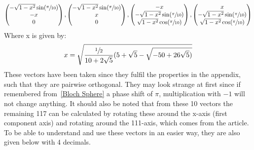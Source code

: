 \documentclass[
  utf8,%
  parskip,%
  largesmallcaps,intlimits,widermath,%
  sharecounter,nobreak,definition=marks,%
  noparts%
]{rtthesis}
\begin{document}
\begin{equation*}
\begin{pmatrix}
-\sqrt{1-x^2}\sin(\sfrac{\pi}{10})\\
-x\\
0\\
\end{pmatrix}
,
\begin{pmatrix}
-\sqrt{1-x^2}\sin(\sfrac{\pi}{10})\\
x\\
0\\
\end{pmatrix}
,
\begin{pmatrix}
-x\\
-\sqrt{1-x^2}\sin(\sfrac{\pi}{10})\\
\sqrt{1-x^2}\cos(\sfrac{\pi}{10})\\
\end{pmatrix}
,
\begin{pmatrix}
x\\
-\sqrt{1-x^2}\sin(\sfrac{\pi}{10})\\
\sqrt{1-x^2}\cos(\sfrac{\pi}{10})\\
\end{pmatrix}
\end{equation*}
Where x is given by:\\
\begin{equation*}
x=\sqrt{\frac{\sfrac{1}{2}}{10+2\sqrt{5}}(5+\sqrt{5}-\sqrt{-50+26\sqrt{5})}}
\end{equation*}
These vectors have been taken since they fulfil the properties in the appendix, such that they are pairwise orthogonal. They may look strange at first since if remembered from~\ref{Bloch Sphere} a phase shift of $\pi$, multiplication with $-1$ will not change anything. It should also be noted that from these 10 vectors the remaining 117 can be calculated by rotating these around the x-axis (first component axis) and rotating around the 111-axis, which comes from the article. To be able to understand and use these vectors in an easier way, they are also given below with 4 decimals.\\
\end{document}
